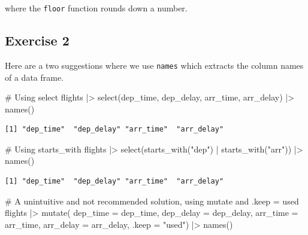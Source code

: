 \documentclass[
  letterpaper,
  DIV=11,
  numbers=noendperiod]{scrreprt}
\newenvironment{Shaded}{\begin{snugshade}}{\end{snugshade}}
\newcommand{\AttributeTok}[1]{\textcolor[rgb]{0.40,0.45,0.13}{#1}}
\newcommand{\CommentTok}[1]{\textcolor[rgb]{0.37,0.37,0.37}{#1}}
\newcommand{\FunctionTok}[1]{\textcolor[rgb]{0.28,0.35,0.67}{#1}}
\newcommand{\NormalTok}[1]{\textcolor[rgb]{0.00,0.23,0.31}{#1}}
\newcommand{\SpecialCharTok}[1]{\textcolor[rgb]{0.37,0.37,0.37}{#1}}
\newcommand{\StringTok}[1]{\textcolor[rgb]{0.13,0.47,0.30}{#1}}
\begin{document}
where the \texttt{floor} function rounds down a number.

\subsection{Exercise 2}\label{exercise-2-8}

Here are a two suggestions where we use \texttt{names} which extracts
the column names of a data frame.

\begin{Shaded}
\begin{Highlighting}[]
\CommentTok{\# Using select}
\NormalTok{flights }\SpecialCharTok{|\textgreater{}}
  \FunctionTok{select}\NormalTok{(dep\_time, dep\_delay, arr\_time, arr\_delay) }\SpecialCharTok{|\textgreater{}}
  \FunctionTok{names}\NormalTok{()}
\end{Highlighting}
\end{Shaded}

\begin{verbatim}
[1] "dep_time"  "dep_delay" "arr_time"  "arr_delay"
\end{verbatim}

\begin{Shaded}
\begin{Highlighting}[]
\CommentTok{\# Using starts\_with}
\NormalTok{flights }\SpecialCharTok{|\textgreater{}}
  \FunctionTok{select}\NormalTok{(}\FunctionTok{starts\_with}\NormalTok{(}\StringTok{"dep"}\NormalTok{) }\SpecialCharTok{|} \FunctionTok{starts\_with}\NormalTok{(}\StringTok{"arr"}\NormalTok{)) }\SpecialCharTok{|\textgreater{}}
  \FunctionTok{names}\NormalTok{()}
\end{Highlighting}
\end{Shaded}

\begin{verbatim}
[1] "dep_time"  "dep_delay" "arr_time"  "arr_delay"
\end{verbatim}

\begin{Shaded}
\begin{Highlighting}[]
\CommentTok{\# A unintuitive and not recommended solution, using mutate and .keep = used}
\NormalTok{flights }\SpecialCharTok{|\textgreater{}}
  \FunctionTok{mutate}\NormalTok{(}
    \AttributeTok{dep\_time =}\NormalTok{ dep\_time, }
    \AttributeTok{dep\_delay =}\NormalTok{ dep\_delay, }
    \AttributeTok{arr\_time =}\NormalTok{ arr\_time, }
    \AttributeTok{arr\_delay =}\NormalTok{ arr\_delay,}
    \AttributeTok{.keep =} \StringTok{"used"}\NormalTok{) }\SpecialCharTok{|\textgreater{}}
  \FunctionTok{names}\NormalTok{()}
\end{Highlighting}
\end{Shaded}
\end{document}
